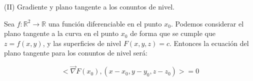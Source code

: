 \documentclass[10pt, titlepage]{article}
\newcommand{\R}{\mathbb{R}}
\begin{document}
\noindent (II) Gradiente y plano tangente a los conuntos de nivel.
\vspace{3mm}

Sea $f : \R^2 \to \R$ una función diferenciable en el punto $x_0$. Podemos considerar el plano tangente a 
la \indent curva en el punto $x_0$ de forma que se cumple que $z = f (x, y)$, y las superficies de nivel 
$F (x, y, z) = c$. \indent Entonces la ecuación del plano tangente para los conuntos de nivel será:
\vspace{3mm}

\[
\boxed{
< \vec{\nabla} F (x_0), (x - x_0, y - y_0, z - z_0) > = 0
}
\]
\end{document}
